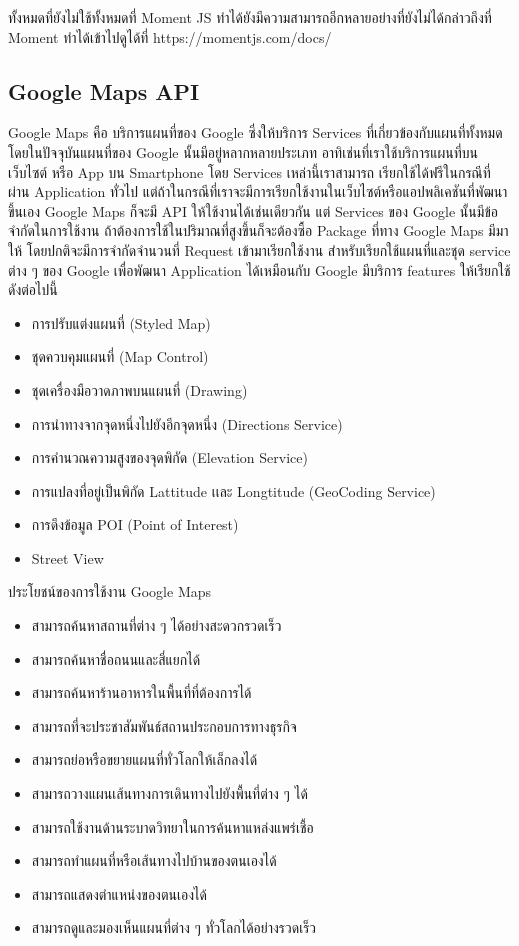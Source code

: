 \begin{enumerate}
ทั้งหมดที่ยังไม่ใช้ทั้งหมดที่ Moment JS ทำได้ยังมีความสามารถอีกหลายอย่างที่ยังไม่ได้กล่าวถึงที่ Moment ทำได้เข้าไปดูได้ที่ https://momentjs.com/docs/

\subsection{Google Maps API}

Google Maps คือ บริการแผนที่ของ Google ซึ่งให้บริการ Services ที่เกี่ยวข้องกับแผนที่ทั้งหมด โดยในปัจจุบันแผนที่ของ Google
นั้นมีอยู่หลากหลายประเภท อาทิเช่นที่เราใช้บริการแผนที่บนเว็บไซต์ หรือ App บน Smartphone โดย Services เหล่านี้เราสามารถ
เรียกใช้ได้ฟรีในกรณีที่ผ่าน Application ทั่วไป แต่ถ้าในกรณีที่เราจะมีการเรียกใช้งานในเว็บไซต์หรือแอปพลิเคชันที่พัฒนาขึ้นเอง Google Maps 
ก็จะมี API ให้ใช้งานได้เช่นเดียวกัน แต่ Services ของ Google นั้นมีข้อจำกัดในการใช้งาน ถ้าต้องการใช้ในปริมาณที่สูงขึ้นก็จะต้องซื้อ Package 
ที่ทาง Google Maps มีมาให้ โดยปกติจะมีการจำกัดจำนวนที่ Request เข้ามาเรียกใช้งาน สำหรับเรียกใช้แผนที่และชุด service ต่าง ๆ ของ Google 
เพื่อพัฒนา Application ได้เหมือนกับ Google มีบริการ features ให้เรียกใช้ดังต่อไปนี้

	\begin{itemize}
		\item การปรับแต่งแผนที่ (Styled Map)
		\item ชุดควบคุมแผนที่ (Map Control)
		\item ชุดเครื่องมือวาดภาพบนแผนที่ (Drawing)
		\item การนำทางจากจุดหนึ่งไปยังอีกจุดหนึ่ง (Directions Service)
		\item การคำนวณความสูงของจุดพิกัด (Elevation Service)
		\item การแปลงที่อยู่เป็นพิกัด Lattitude เเละ Longtitude (GeoCoding Service)
		\item การดึงข้อมูล POI (Point of Interest)
		\item Street View
	\end{itemize}

	ประโยชน์ของการใช้งาน Google Maps

	\begin{itemize}
		\item สามารถค้นหาสถานที่ต่าง ๆ ได้อย่างสะดวกรวดเร็ว
		\item สามารถค้นหาชื่อถนนและสี่แยกได้
		\item สามารถค้นหาร้านอาหารในพื้นที่ที่ต้องการได้
		\item สามารถที่จะประชาสัมพันธ์สถานประกอบการทางธุรกิจ
		\item สามารถย่อหรือขยายแผนที่ทั่วโลกให้เล็กลงได้
		\item สามารถวางแผนเส้นทางการเดินทางไปยังพื้นที่ต่าง ๆ ได้
		\item สามารถใช้งานด้านระบาดวิทยาในการค้นหาแหล่งแพร่เชื้อ
		\item สามารถทำแผนที่หรือเส้นทางไปบ้านของตนเองได้
		\item สามารถแสดงตำแหน่งของตนเองได้
		\item สามารถดูและมองเห็นแผนที่ต่าง ๆ ทั่วโลกได้อย่างรวดเร็ว
	\end{itemize}


\end{enumerate}
